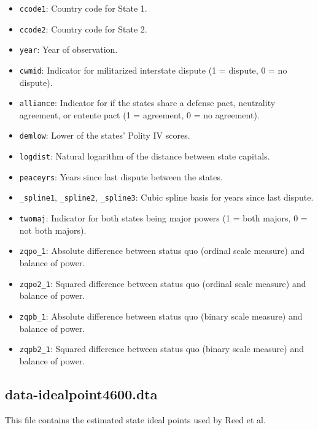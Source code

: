 \documentclass[12pt]{article}
\begin{document}
\begin{itemize}
  \item \texttt{ccode1}: Country code for State 1.
  \item \texttt{ccode2}: Country code for State 2.
  \item \texttt{year}: Year of observation.
  \item \texttt{cwmid}: Indicator for militarized interstate dispute (1 = dispute, 0 = no dispute).
  \item \texttt{alliance}: Indicator for if the states share a defense pact, neutrality agreement, or entente pact (1 = agreement, 0 = no agreement).
  \item \texttt{demlow}: Lower of the states' Polity IV scores.
  \item \texttt{logdist}: Natural logarithm of the distance between state capitals.
  \item \texttt{peaceyrs}: Years since last dispute between the states.
  \item \texttt{\_spline1}, \texttt{\_spline2}, \texttt{\_spline3}: Cubic spline basis for years since last dispute.
  \item \texttt{twomaj}: Indicator for both states being major powers (1 = both majors, 0 = not both majors).
  \item \texttt{zqpo\_1}: Absolute difference between status quo (ordinal scale measure) and balance of power.
  \item \texttt{zqpo2\_1}: Squared difference between status quo (ordinal scale measure) and balance of power.
  \item \texttt{zqpb\_1}: Absolute difference between status quo (binary scale measure) and balance of power.
  \item \texttt{zqpb2\_1}: Squared difference between status quo (binary scale measure) and balance of power.
\end{itemize}

\subsection{data-idealpoint4600.dta}

This file contains the estimated state ideal points used by Reed et al.
\end{document}
